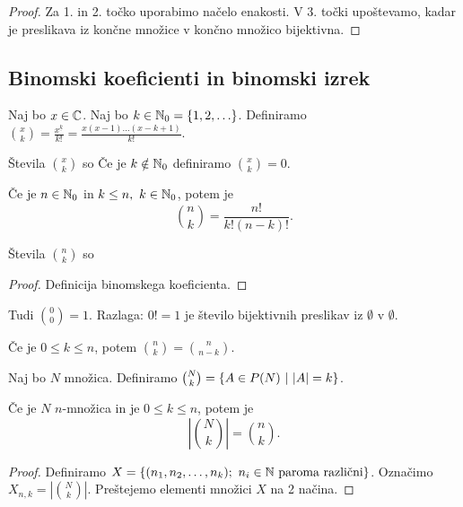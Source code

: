 \begin{proof}
    Za 1. in 2. točko uporabimo načelo enakosti. V 3. točki upoštevamo, kadar je preslikava iz končne množice v končno množico bijektivna.
\end{proof}

\newpage
\subsection{Binomski koeficienti in binomski izrek}
\begin{definicija}
    Naj bo $x \in \mathbb{C}$. Naj bo $k \in \mathbb{N}_0 = \left\{1, 2, \ldots\right\}$. Definiramo $\binom{x}{k} = \frac{x^{\underline{k}}}{k!} = \frac{x(x-1)\ldots (x-k+1)}{k!}$. 
    
    Števila $\binom{x}{k}$ so 
    Če je $k \notin \mathbb{N}_0$ definiramo $\binom{x}{k} = 0$.
\end{definicija}

\begin{trditev}
    Če je $n \in \mathbb{N}_0$ in $k \leq n, \ k \in \mathbb{N}_0$, potem je 
    $$\binom{n}{k} = \frac{n!}{k!(n-k)!}.$$

    Števila $\binom{n}{k}$ so 
\end{trditev}

\begin{proof}
    Definicija binomskega koeficienta.
\end{proof}

\begin{opomba}
    Tudi $\binom{0}{0} = 1$. Razlaga: $0! = 1$ je število bijektivnih preslikav iz $\emptyset$ v $\emptyset$.
\end{opomba}

\begin{opomba}
    Če je $0 \leq k \leq n$, potem $\binom{n}{k} = \binom{n}{n-k}$.
\end{opomba}

\begin{definicija}
    Naj bo $N$ množica. Definiramo $\binom{N}{k} = \left\{A \in P(N) \ | \ |A| = k\right\}$.
\end{definicija}

\begin{trditev}
    Če je $N$ $n$-množica in je $0 \leq k \leq n$, potem je 
    $$\left| \binom{N}{k} \right| = \binom{n}{k}.$$
\end{trditev}

\begin{proof}
    Definiramo $X = \left\{(n_1, n_2, \ldots, n_k); \ n_i \in \mathbb{N} \text{ paroma različni}\right\}$. Označimo $X_{n,k} = \left| \binom{N}{k} \right|$. Preštejemo elementi množici $X$ na 2 načina.
\end{proof}

